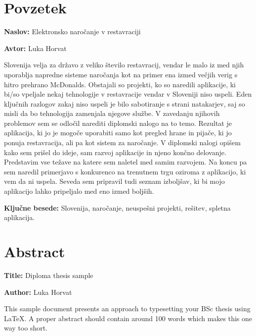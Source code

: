\documentclass[a4paper, 12pt]{book}
\newcommand{\ttitle}{Elektronsko naročanje v restavraciji}
\newcommand{\ttitleEn}{Diploma thesis sample}
\newcommand{\tauthor}{Luka Horvat}
\newcommand{\tkeywords}{Slovenija, naročanje, neuspešni projekti, rešitev, spletna aplikacija}
\newcommand{\clearemptydoublepage}{\newpage{\pagestyle{empty}\cleardoublepage}}
\begin{document}
\clearemptydoublepage

\chapter*{Povzetek}

\noindent\textbf{Naslov:} \ttitle
\bigskip

\noindent\textbf{Avtor:} \tauthor
\bigskip

\noindent 
Slovenija velja za državo z veliko število restavracij, vendar le malo iz med njih uporablja napredne sisteme naročanja kot na primer ena izmed večjih verig s hitro prehrano McDonalds. Obstajali so projekti, ko so naredili aplikacije, ki bi/so vpeljale nekaj tehnologije v restavracije vendar v Sloveniji niso uspeli. Eden ključnih razlogov zakaj niso uspeli je bilo sabotiranje s strani natakarjev, saj so misli da bo tehnologija zamenjala njegove službe. V zavedanju njihovih problemov sem se odločil narediti diplomski nalogo na to temo. Rezultat je aplikacija, ki jo je mogoče uporabiti samo kot pregled hrane in pijače, ki jo ponuja restavracija, ali pa kot sistem za naročanje. V diplomski nalogi opišem kako sem prišel do ideje, sam razvoj aplikacije in njeno končno delovanje. Predstavim vse težave na katere sem naletel med samim razvojem. Na koncu pa sem naredil primerjavo s konkurenco na trenutnem trgu oziroma z aplikacijo, ki vem da ni uspela. Seveda sem pripravil tudi seznam izboljšav, ki bi mojo aplikacijo lahko pripeljalo med eno izmed boljših.

\noindent\textbf{Ključne besede:} \tkeywords.
\clearemptydoublepage

\chapter*{Abstract}

\noindent\textbf{Title:} \ttitleEn
\bigskip

\noindent\textbf{Author:} \tauthor
\bigskip

\noindent This sample document presents an approach to typesetting your BSc thesis using \LaTeX. 
A proper abstract should contain around 100 words which makes this one way too short.
\bigskip
\end{document}

